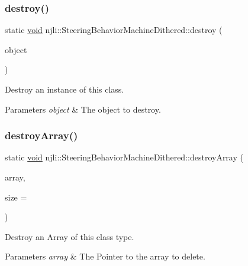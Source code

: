 \subsubsection{\texorpdfstring{destroy()}{destroy()}}
{\footnotesize\ttfamily static \mbox{\hyperlink{_thread_8h_af1e856da2e658414cb2456cb6f7ebc66}{void}} njli\+::\+Steering\+Behavior\+Machine\+Dithered\+::destroy (\begin{DoxyParamCaption}\item[{\mbox{\hyperlink{classnjli_1_1_steering_behavior_machine_dithered}{Steering\+Behavior\+Machine\+Dithered}} $\ast$}]{object }\end{DoxyParamCaption})\hspace{0.3cm}{\ttfamily [static]}}

Destroy an instance of this class.


\begin{DoxyParams}{Parameters}
{\em object} & The object to destroy. \\
\hline
\end{DoxyParams}
\mbox{\label{classnjli_1_1_steering_behavior_machine_dithered_a8b50147d7efe72e24c8508272db0ec16}} 
\subsubsection{\texorpdfstring{destroy\+Array()}{destroyArray()}}
{\footnotesize\ttfamily static \mbox{\hyperlink{_thread_8h_af1e856da2e658414cb2456cb6f7ebc66}{void}} njli\+::\+Steering\+Behavior\+Machine\+Dithered\+::destroy\+Array (\begin{DoxyParamCaption}\item[{\mbox{\hyperlink{classnjli_1_1_steering_behavior_machine_dithered}{Steering\+Behavior\+Machine\+Dithered}} $\ast$$\ast$}]{array,  }\item[{const \mbox{\hyperlink{_util_8h_a10e94b422ef0c20dcdec20d31a1f5049}{u32}}}]{size = {} }\end{DoxyParamCaption})\hspace{0.3cm}{\ttfamily [static]}}

Destroy an Array of this class type.


\begin{DoxyParams}{Parameters}
{\em array} & The Pointer to the array to delete. \\
\hline
\end{DoxyParams}
\mbox{\label{classnjli_1_1_steering_behavior_machine_dithered_a3262e6d95dbb37c00fcc3436b1e48233}} 
